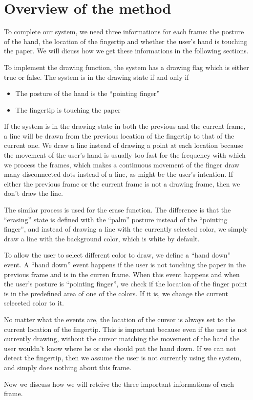 \section{Overview of the method}
To complete our system, we need three informations for each frame: the posture of the hand, the location of the fingertip and whether the user's hand is touching the paper. We will dicuss how we get these informations in the following sections. 

To implement the drawing function, the system has a drawing flag which is either true or false. The system is in the drawing state if and only if 
\begin{itemize}
\item
The posture of the hand is the ``pointing finger''
\item
The fingertip is touching the paper
\end{itemize}
If the system is in the drawing state in both the previous and the current frame, a line will be drawn from the previous location of the fingertip to that of the current one. We draw a line instead of drawing a point at each location because the movement of the user's hand is usually too fast for the frequency with which we process the frames, which makes a continuous movement of the finger draw many disconnected dots instead of a line, as might be the user's intention. If either the previous frame or the current frame is not a drawing frame, then we don't draw the line. 

The similar process is used for the erase function. The difference is that the ``erasing'' state is defined with the ``palm'' posture instead of the ``pointing finger'', and instead of drawing a line with the currently selected color, we simply draw a line with the background color, which is white by default.

To allow the user to select different color to draw, we define a ``hand down'' event. A ``hand down'' event happens if the user is not touching the paper in the previous frame and is in the curren frame. When this event happens and when the user's posture is ``pointing finger'', we check if the location of the finger point is in the predefined area of one of the colors. If it is, we change the current seleceted color to it. 

No matter what the events are, the location of the cursor is always set to the current location of the fingertip. This is important because even if the user is not currently drawing, without the cursor matching the movement of the hand the user wouldn't know where he or she should put the hand down. If we can not detect the fingertip, then we assume the user is not currently using the system, and simply does nothing about this frame. 

Now we discuss how we will reteive the three important informations of each frame. 
